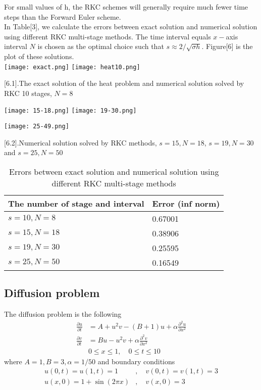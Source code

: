 \documentclass{article}
\theoremstyle{theorem}
\theoremstyle{definition}
\begin{document}
	For small values of h, the RKC schemes will generally require much fewer time steps than the Forward Euler scheme.\\
	In Table[3], we calculate the errors between exact solution and numerical solution using different RKC multi-stage methods. The time interval equals $x-$axis interval $N$ is chosen as the optimal choice such that $s \approx 2/\sqrt{\sigma h}$. Figure[6] is the plot of these solutions.\\
			\texttt{[image: exact.png]}
		\texttt{[image: heat10.png]} \begin{center}
		\figurename[6.1]{.The exact solution of the heat problem and numerical solution solved by RKC 10 stages, $N=8$} 
	\end{center}		
			\texttt{[image: 15-18.png]}
		\texttt{[image: 19-30.png]}
	\begin{center}
			\texttt{[image: 25-49.png]}
	\end{center}
		\begin{center}\figurename[6.2]{.Numerical solution solved by RKC methods, $s=15,N=18$,  $s=19,N=30$ and  $s=25,N=50$}
		\end{center}
	
		\begin{table}
		\begin{tabular}{ | m{15em} | m{2.5cm}|  }  
			\hline
			The number of stage and interval & Error (inf norm)\\
			\hline
			$s=10 , N=8$ &  0.67001\\
			\hline 
			$s=15 , N=18$ & 0.38906 \\
		\hline
			$s=19 , N=30$ & 0.25595 \\
		\hline
			$s=25 , N=50$ & 0.16549 \\
		\hline
		\end{tabular}
	\caption{Errors between exact solution and numerical solution using different RKC multi-stage methods }
	\end{table}
\subsection{Diffusion problem}	The diffusion problem is the following
$$\begin{aligned}\frac{\partial u}{\partial t}&=A+u^2v-(B+1)u+\alpha \frac{\partial^2u}{\partial x^2} \\ \frac{\partial v}{\partial t}&=Bu-u^2v+\alpha \frac{\partial^2v}{\partial x^2} \\
& 0 \le x \le 1, \quad 0 \le t \le 10 \end{aligned}$$
where $A=1,B=3, \alpha = 1/50$ and boundary conditions $$\begin{aligned} u(0,t)=u(1,t)=1&, \quad v(0,t)=v(1,t)=3 \\
u(x,0)=1+\sin(2\pi x)&, \quad v(x,0)=3 \end{aligned}$$
\end{document}
